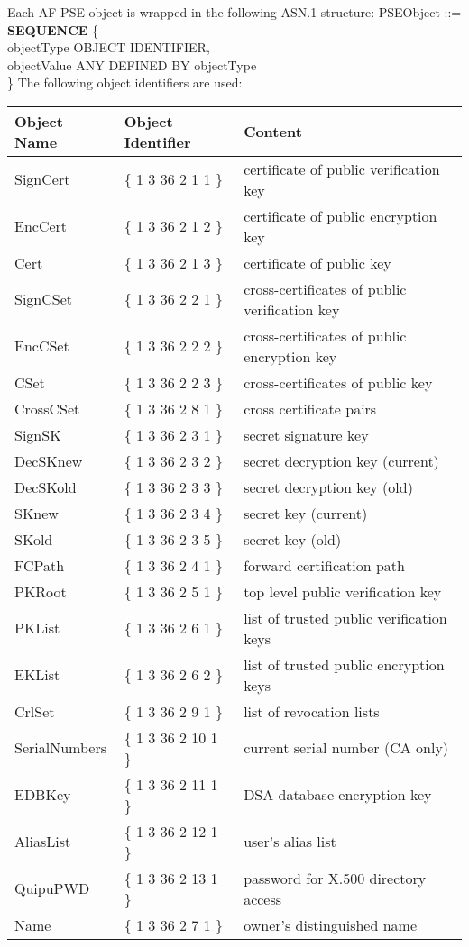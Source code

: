 Each AF PSE object is wrapped in the following ASN.1 structure:
{\small
\bvtab
\2 PSEObject ::= \3 {\bf SEQUENCE} \{ \\
\7 objectType \3 OBJECT IDENTIFIER, \\
\7 objectValue \3 ANY DEFINED BY objectType \\
\5 \}
\evtab
}
The following object identifiers are used:
\bc
\begin{tabular}{|l|l|l|} \hline
{\bf Object Name} & {\bf Object Identifier} & {\bf Content} \\ \hline
SignCert       & \{ 1 3 36 2 1 1 \} & certificate of public verification key      \\
EncCert        & \{ 1 3 36 2 1 2 \} & certificate of public encryption key        \\
Cert           & \{ 1 3 36 2 1 3 \} & certificate of public key                    \\
SignCSet       & \{ 1 3 36 2 2 1 \} & cross-certificates of public verification key \\
EncCSet        & \{ 1 3 36 2 2 2 \} & cross-certificates of public encryption key   \\
CSet           & \{ 1 3 36 2 2 3 \} & cross-certificates of public key            \\
CrossCSet      & \{ 1 3 36 2 8 1 \} & cross certificate pairs		     \\
SignSK         & \{ 1 3 36 2 3 1 \} & secret signature key                        \\
DecSKnew       & \{ 1 3 36 2 3 2 \} & secret decryption key (current)             \\
DecSKold       & \{ 1 3 36 2 3 3 \} & secret decryption key (old)                 \\
SKnew          & \{ 1 3 36 2 3 4 \} & secret key (current)                        \\
SKold          & \{ 1 3 36 2 3 5 \} & secret key (old)                            \\
FCPath         & \{ 1 3 36 2 4 1 \} & forward certification path                  \\
PKRoot         & \{ 1 3 36 2 5 1 \} & top level public verification key           \\
PKList         & \{ 1 3 36 2 6 1 \} & list of trusted public verification keys    \\
EKList         & \{ 1 3 36 2 6 2 \} & list of trusted public encryption keys      \\
CrlSet         & \{ 1 3 36 2 9 1 \} & list of revocation lists         \\
SerialNumbers  & \{ 1 3 36 2 10 1 \} & current serial number (CA only)         \\
EDBKey         & \{ 1 3 36 2 11 1 \} & DSA database encryption key        \\
AliasList      & \{ 1 3 36 2 12 1 \} & user's alias list         \\
QuipuPWD       & \{ 1 3 36 2 13 1 \} & password for X.500 directory access         \\
Name           & \{ 1 3 36 2 7 1 \}  & owner's distinguished name                      \\ \hline
\end{tabular}
